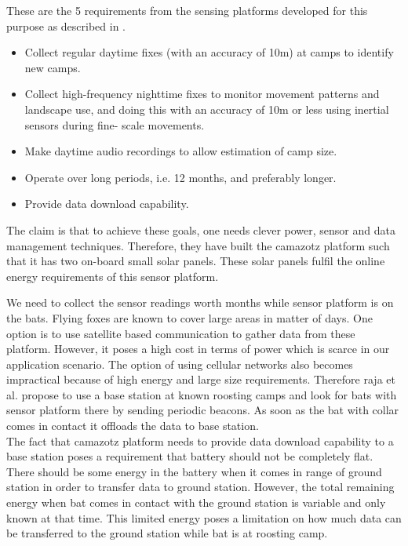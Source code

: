 \documentclass[conference]{IEEEtran}
\begin{document}
These are the 5 requirements from the sensing platforms developed for this purpose as described 
in \cite{raja-ipsn}.
\begin{itemize}
\item Collect regular daytime fixes (with an accuracy of 10m) at camps to identify new camps.
\item Collect high-frequency nighttime fixes to monitor movement patterns and landscape use, and doing this with an accuracy of 10m or less using inertial sensors during fine- scale movements.
\item Make daytime audio recordings to allow estimation of camp size.
\item Operate over long periods, i.e. 12 months, and preferably longer.
\item Provide data download capability.
\end{itemize}

The claim is that to achieve these goals, one needs clever power, sensor and data management techniques. Therefore, they have built the camazotz platform such that it has two on-board small solar panels. These solar panels fulfil the online energy requirements of this sensor platform\cite{raja-ipsn}.\

We need to collect the sensor readings worth months while sensor platform is on the bats. Flying foxes are known to cover large areas in matter of days. One option is to use satellite based communication to gather data from these platform. However, it poses a high cost in terms of power which is scarce in our application scenario. The option of using cellular networks also becomes impractical because of high energy and large size requirements. Therefore raja et al. propose to use a base station at known roosting camps and look for bats with sensor platform there by sending periodic beacons. As soon as the bat with collar comes in contact it offloads the data to base station.\\

The fact that camazotz platform needs to provide data download capability to a base station poses a requirement that battery should not be completely flat. There should be some energy in the battery when it comes in range of ground station in order to transfer data to ground station. However, the total remaining energy when bat comes in contact with the ground station is variable and only known at that time. This limited energy poses a limitation on how much data can be transferred to the ground station while bat is at roosting camp.\
\end{document}
